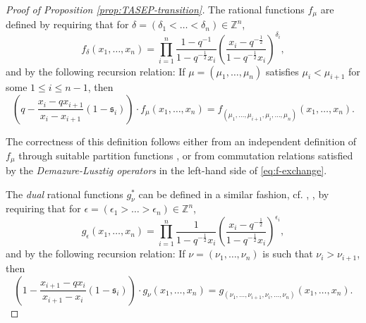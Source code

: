 \documentclass[11pt,reqno]{amsart}
\theoremstyle{definition}
\theoremstyle{remark}
\theoremstyle{remark}
\def\leq{\leqslant}
\renewcommand\le{\leq}
\def\Z{\mathbb Z}
\numberwithin{equation}{section}
\begin{document}
\begin{proof}[Proof of Proposition \ref{prop:TASEP-transition}]
		The rational functions $f_\mu$ are defined by requiring that for $\delta=(\delta_1<\dots<\delta_n)\in \Z^n$,  
		\begin{equation}\label{eq:f-antidominant}
			f_\delta (x_1,\dots,x_n)= \prod_{i=1}^n \frac {1-q^{-1}}{1-q^{-\frac 12}x_i}\left(\frac{x_i-q^{-\frac 12}}{1-q^{-\frac 12}x_i}\right)^{\delta_i}, 
		\end{equation}
		and by the following recursion relation: If $\mu=(\mu_1,\dots,\mu_n)$ satisfies $\mu_i<\mu_{i+1}$ for some $1\le i\le n-1$, then 
		\begin{equation}
			\label{eq:f-exchange}
			\left(q - \frac{x_i-q x_{i+1}}{x_i-x_{i+1}} (1-\mathfrak{s}_i)\right) \cdot f_{\mu}(x_1,\dots,x_n) = f_{(\mu_1,\dots,\mu_{i+1},\mu_i,\dots,\mu_n)}(x_1,\dots,x_n).
		\end{equation}
		
		The correctness of this definition follows either from an independent definition of $f_\mu$ through suitable partition functions \cite[Definition 3.4.3]{BW-coloured}, or from commutation relations satisfied by the \emph{Demazure-Lusztig operators} in the left-hand side of \eqref{eq:f-exchange}.
		
		The \emph{dual} rational functions $g_\nu^*$ can be defined in a similar fashion, cf. \cite[(5.9.17)]{BW-coloured}, \cite[Theorem 5.8.1]{BW-coloured}, by requiring that for $\epsilon=(\epsilon_1>\dots>\epsilon_n)\in\Z^n$, 
		\begin{equation}\label{eq:g-antidominant}
			g_\epsilon(x_1,\dots,x_n)=\prod_{i=1}^n \frac 1{1-q^{-\frac 12}x_i}\left(\frac{x_i-q^{-\frac 12}}{1-q^{-\frac 12}x_i}\right)^{\epsilon_i},
		\end{equation}
		and by the following recursion relation: If $\nu=(\nu_1,\dots,\nu_n)$ is such that $\nu_i>\nu_{i+1}$, then 
		\begin{equation}
			\label{eq:g-exchange}
			\left(1-\frac{x_{i+1}-qx_i}{x_{i+1}-x_i}(1-\mathfrak s_i)\right)\cdot g_\nu(x_1,\dots,x_n)=g_{(\nu_1,\dots,\nu_{i+1},\nu_i,\dots,\nu_n)}(x_1,\dots,x_n).
		\end{equation}
		

\end{proof}
\end{document}
